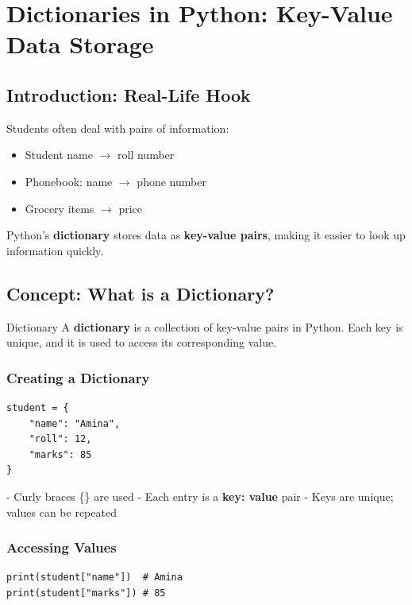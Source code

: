 \chapter{Dictionaries in Python: Key-Value Data Storage}

\section{Introduction: Real-Life Hook}

Students often deal with pairs of information:

\begin{itemize}
    \item Student name $\rightarrow$ roll number  
    \item Phonebook: name $\rightarrow$ phone number  
    \item Grocery items $\rightarrow$ price  
\end{itemize}

Python’s \textbf{dictionary} stores data as \textbf{key-value pairs}, making it easier to look up information quickly.

\section{Concept: What is a Dictionary?}

\begin{definition}{Dictionary}
A \textbf{dictionary} is a collection of key-value pairs in Python. Each key is unique, and it is used to access its corresponding value.
\end{definition}

\subsection{Creating a Dictionary}

\begin{verbatim}
student = {
    "name": "Amina",
    "roll": 12,
    "marks": 85
}
\end{verbatim}

- Curly braces \{\} are used  
- Each entry is a \textbf{key: value} pair  
- Keys are unique; values can be repeated

\subsection{Accessing Values}

\begin{verbatim}
print(student["name"])  # Amina
print(student["marks"]) # 85
\end{verbatim}

